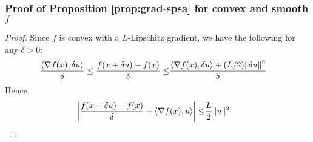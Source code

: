 
\subsubsection*{Proof of Proposition \ref{prop:grad-spsa} for convex and smooth $f$}
\begin{proof}
Since $f$ is convex with a  $L$-Lipschitz gradient, we have the following for any $\delta>0$:
\begin{align*}
\frac{\left\langle\nabla f(x), \delta u\right\rangle}{\delta} \le \frac{f(x + \delta u) -  f(x)}{\delta} \le& \frac{\left\langle\nabla f(x), \delta u\right\rangle + (L / 2) \|\delta u\|^2}{\delta}
\end{align*}
Hence,
\begin{align*}
\left|\frac{f(x + \delta u) -  f(x)}{\delta} - \left\langle\nabla f(x),  u\right\rangle \right| \le&  \dfrac{L}{2} \|u\|^2
\end{align*}

\end{proof}



